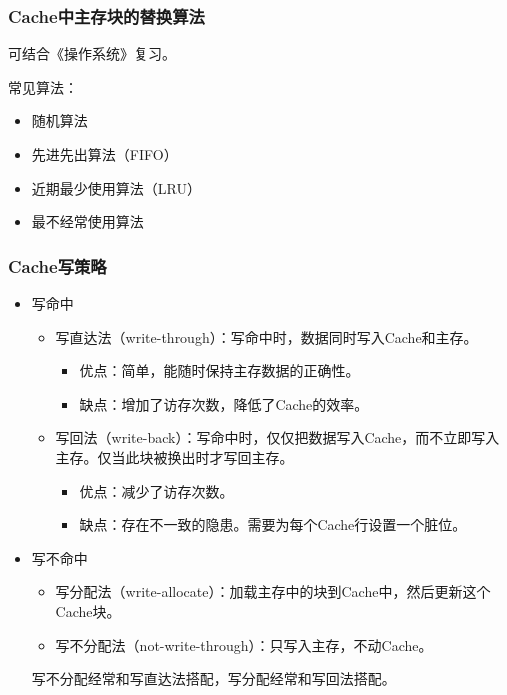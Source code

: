 \documentclass[12pt, a4paper, oneside]{ctexart}
\begin{document}
\subsubsection{Cache中主存块的替换算法}

可结合《操作系统》复习。

常见算法：
\begin{itemize}
  \item 随机算法
  \item 先进先出算法（FIFO）
  \item 近期最少使用算法（LRU）
  \item 最不经常使用算法
\end{itemize}

\subsubsection{Cache写策略}

\begin{itemize}
  \item 写命中
  \begin{itemize}
    \item 写直达法（write-through）：写命中时，数据同时写入Cache和主存。
    \begin{itemize}
      \item 优点：简单，能随时保持主存数据的正确性。
      \item 缺点：增加了访存次数，降低了Cache的效率。
    \end{itemize}
    \item 写回法（write-back）：写命中时，仅仅把数据写入Cache，而不立即写入主存。仅当此块被换出时才写回主存。
    \begin{itemize}
      \item 优点：减少了访存次数。
      \item 缺点：存在不一致的隐患。需要为每个Cache行设置一个脏位。
    \end{itemize}
  \end{itemize}
  \item 写不命中
  \begin{itemize}
    \item 写分配法（write-allocate）：加载主存中的块到Cache中，然后更新这个Cache块。
    \item 写不分配法（not-write-through）：只写入主存，不动Cache。
  \end{itemize}
  写不分配经常和写直达法搭配，写分配经常和写回法搭配。
\end{itemize}
\end{document}
